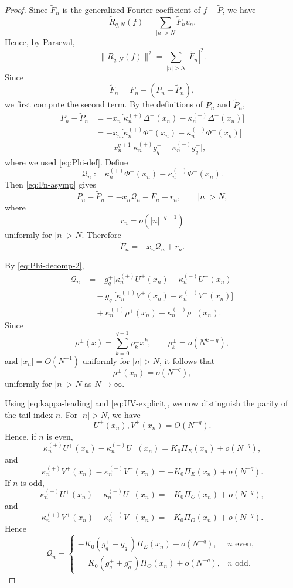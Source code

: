\documentclass[11pt,a4paper]{article}
\theoremstyle{definition}
\begin{document}
\begin{proof} 
Since $\widetilde F_n$ is the generalized Fourier coefficient of
$f-\widetilde P$, we have
\[
\widetilde R_{q,N}(f)
=
\sum_{|n|>N}\widetilde F_n v_n.
\]
Hence, by Parseval,
\[
\|\widetilde R_{q,N}(f)\|^2
=
\sum_{|n|>N}|\widetilde F_n|^2.
\]
Since
\[
\widetilde F_n
=
F_n+(P_n-\widetilde P_n),
\]
we first compute the second term. By the definitions of $P_n$ and
$\widetilde P_n$,
\begin{align*}
P_n-\widetilde P_n
&=
-x_n\bigl[
\kappa_n^{(+)}\Delta^+(x_n)
-\kappa_n^{(-)}\Delta^-(x_n)
\bigr]
\\
&=
-x_n\bigl[
\kappa_n^{(+)}\Phi^+(x_n)
-\kappa_n^{(-)}\Phi^-(x_n)
\bigr]
\\
&\quad
-x_n^{q+1}
\bigl[
\kappa_n^{(+)}g_q^+
-\kappa_n^{(-)}g_q^-
\bigr],
\end{align*}
where we used \eqref{eq:Phi-def}. Define
\[
\mathcal Q_n
:=
\kappa_n^{(+)}\Phi^+(x_n)
-\kappa_n^{(-)}\Phi^-(x_n).
\]
Then \eqref{eq:Fn-asymp} gives
\[
P_n-\widetilde P_n
=
-x_n\mathcal Q_n-F_n+r_{n},
\qquad
|n|>N,
\]
where
\[
r_{n}=o(|n|^{-q-1})
\]
uniformly for $|n|>N$. Therefore
\begin{equation}\label{eq:tildeFn-id}
\widetilde F_n
=
-x_n\mathcal Q_n+r_{n}.
\end{equation}

By \eqref{eq:Phi-decomp-2},
\begin{align*}
\mathcal Q_n
&=
-g_q^+
\bigl[
\kappa_n^{(+)}U^+(x_n)
-\kappa_n^{(-)}U^-(x_n)
\bigr]
\\
&\quad
-g_q^-
\bigl[
\kappa_n^{(+)}V^+(x_n)
-\kappa_n^{(-)}V^-(x_n)
\bigr]
\\
&\quad
+\kappa_n^{(+)}\rho^+(x_n)
-\kappa_n^{(-)}\rho^-(x_n).
\end{align*}
Since
\[
\rho^\pm(x)
=
\sum_{k=0}^{q-1}\rho_k^\pm x^k,
\qquad
\rho_k^\pm=o(N^{k-q}),
\]
and $|x_n|=O(N^{-1})$ uniformly for $|n|>N$, it follows that
\[
\rho^\pm(x_n)=o(N^{-q}),
\]
uniformly for $|n|>N$ as $N\to\infty$.

Using \eqref{eq:kappa-leading} and \eqref{eq:UV-explicit}, we now
distinguish the parity of the tail index $n$. For $|n|>N$, we have
\[
U^\pm(x_n),V^\pm(x_n)=O(N^{-q}).
\]
Hence, if $n$ is even,
\[
\kappa_n^{(+)}U^+(x_n)-\kappa_n^{(-)}U^-(x_n)
=
K_0\Pi_E(x_n)
+
o\!\left(N^{-q}\right),
\]
and
\[
\kappa_n^{(+)}V^+(x_n)-\kappa_n^{(-)}V^-(x_n)
=
-K_0\Pi_E(x_n)
+
o\!\left(N^{-q}\right).
\]
If $n$ is odd,
\[
\kappa_n^{(+)}U^+(x_n)-\kappa_n^{(-)}U^-(x_n)
=
-K_0\Pi_O(x_n)
+
o\!\left(N^{-q}\right),
\]
and
\[
\kappa_n^{(+)}V^+(x_n)-\kappa_n^{(-)}V^-(x_n)
=
-K_0\Pi_O(x_n)
+
o\!\left(N^{-q}\right).
\]
Hence
\begin{equation}\label{eq:Qn-cases}
\mathcal Q_n
=
\begin{cases}
-K_0(g_q^+-g_q^-)\Pi_E(x_n)+o\!\left(N^{-q}\right),
& n\text{ even},
\\[2mm]
\phantom{-}K_0(g_q^++g_q^-)\Pi_O(x_n)+o\!\left(N^{-q}\right),
& n\text{ odd}.
\end{cases}
\end{equation}


\end{proof}
\end{document}
